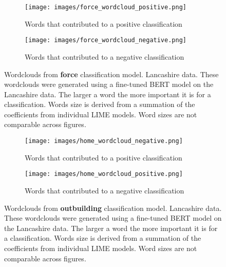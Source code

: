 \begin{figure}
     \centering
     \begin{subfigure}[b]{0.9\textwidth}
         \centering
         \texttt{[image: images/force\_wordcloud\_positive.png]}
         \caption{Words that contributed to a positive classification}
         \label{fig: wordcloud_force_lancs}
     \end{subfigure}
     \vfill
     \begin{subfigure}[b]{0.9\textwidth}
         \centering
         \texttt{[image: images/force\_wordcloud\_negative.png]}
         \caption{Words that contributed to a negative classification}
         \label{fig: wordcloud_force_rev_lancs}
     \end{subfigure}
        \caption[Wordclouds from  \textbf{force} classification model. Lancashire data.]{{Wordclouds from  \textbf{force} classification model. Lancashire data.} These wordclouds were generated using a fine-tuned BERT model on the Lancashire data. The larger a word the more important it is for a classification. Words size is derived from a summation of the coefficients from individual LIME models. Word sizes are not comparable across figures.}
        \label{fig:wordcloud_force_both_lancs}
        
\end{figure}




\begin{figure}
     \centering
     \begin{subfigure}[b]{0.9\textwidth}
         \centering
         \texttt{[image: images/home\_wordcloud\_negative.png]}
         \caption{Words that contributed to a positive classification}
         \label{fig: wordcloud_home_lancs}
     \end{subfigure}
     \vfill
     \begin{subfigure}[b]{0.9\textwidth}
         \centering
         \texttt{[image: images/home\_wordcloud\_positive.png]}
         \caption{Words that contributed to a negative classification}
         \label{fig: wordcloud_home_rev_lancs}
     \end{subfigure}
        \caption[Wordclouds from  \textbf{outbuilding} classification model. Lancashire data.]{{Wordclouds from  \textbf{outbuilding} classification model. Lancashire data.} These wordclouds were generated using a fine-tuned BERT model on the Lancashire data. The larger a word the more important it is for a classification. Words size is derived from a summation of the coefficients from individual LIME models. Word sizes are not comparable across figures.}
        \label{fig:wordcloud_home_both_lancs}
        
\end{figure}





